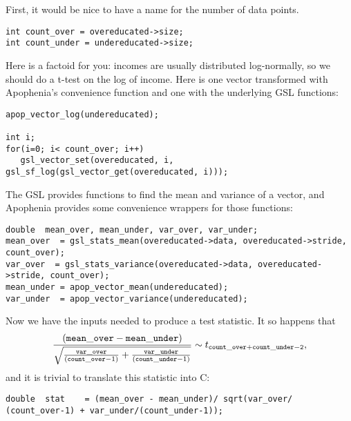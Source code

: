 First, it would be nice to have a name for the number of data points.
\begin{lstlisting}
int count_over = overeducated->size;
int count_under = undereducated->size;
\end{lstlisting}

Here is a factoid for you: incomes are usually distributed log-normally, so we should do a t-test on the
log of income. Here is one  vector transformed with Apophenia's convenience function and one with the underlying GSL functions: 
\begin{lstlisting}
apop_vector_log(undereducated);

int i;
for(i=0; i< count_over; i++)
   gsl_vector_set(overeducated, i, gsl_sf_log(gsl_vector_get(overeducated, i)));
\end{lstlisting}

The GSL 
provides functions to find the mean and variance of a vector, and 
Apophenia provides some convenience wrappers for those functions:

\begin{lstlisting}
double	mean_over, mean_under, var_over, var_under;
mean_over  = gsl_stats_mean(overeducated->data, overeducated->stride,
count_over);
var_over  = gsl_stats_variance(overeducated->data, overeducated->stride, count_over);
mean_under = apop_vector_mean(undereducated);
var_under  = apop_vector_variance(undereducated);
\end{lstlisting}

Now we have the inputs needed to produce a test statistic. It so happens
that 
\startonecol
$$
\frac{({\tt mean\_over - mean\_under})}
{\sqrt{\frac{{\tt var\_over}}{({\tt count\_over}-1)}+ \frac{{\tt var\_under}}{({\tt count\_under}-1)}}} \sim t_{\tt count\_over + count\_under - 2},
$$
\endonecol
and it is trivial to translate this statistic into C: 
\begin{lstlisting}
double	stat    = (mean_over - mean_under)/ sqrt(var_over/ (count_over-1) + var_under/(count_under-1));
\end{lstlisting}

